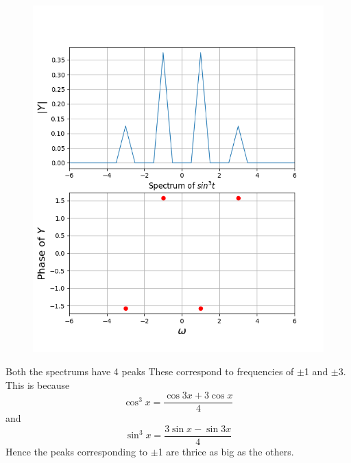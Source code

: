 \documentclass[11pt, a4paper]{article}
\begin{document}
\begin{figure}[!tbh]
   	\centering
   	\includegraphics[scale=0.5]{img6.png}
   	\label{fig:32}
   \end{figure}
{
Both the spectrums have 4 peaks
These correspond to frequencies of $\pm$1 and $\pm$3. This is because
\[ \cos^3x =\frac{ \cos 3x +3\cos x}{4} \]
and
\[ \sin^3x =\frac{3\sin x-\sin 3x}{4} \]
Hence the peaks corresponding to $\pm$1 are thrice as big as the others.
}
\end{document}
